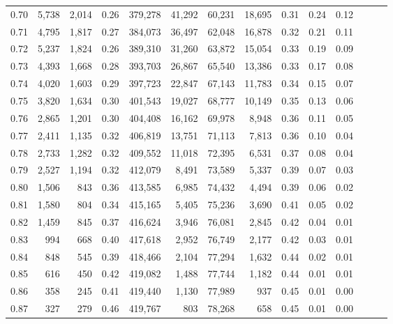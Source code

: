 \begin{tabular}{rrrrrrrrrrrrrr}
0.70 &   5,738 &  2,014 &  0.26 &  379,278 &   41,292 &  60,231 &  18,695 &  0.31 &  0.24 &      0.12 \\
0.71 &   4,795 &  1,817 &  0.27 &  384,073 &   36,497 &  62,048 &  16,878 &  0.32 &  0.21 &      0.11 \\
0.72 &   5,237 &  1,824 &  0.26 &  389,310 &   31,260 &  63,872 &  15,054 &  0.33 &  0.19 &      0.09 \\
0.73 &   4,393 &  1,668 &  0.28 &  393,703 &   26,867 &  65,540 &  13,386 &  0.33 &  0.17 &      0.08 \\
0.74 &   4,020 &  1,603 &  0.29 &  397,723 &   22,847 &  67,143 &  11,783 &  0.34 &  0.15 &      0.07 \\
0.75 &   3,820 &  1,634 &  0.30 &  401,543 &   19,027 &  68,777 &  10,149 &  0.35 &  0.13 &      0.06 \\
0.76 &   2,865 &  1,201 &  0.30 &  404,408 &   16,162 &  69,978 &   8,948 &  0.36 &  0.11 &      0.05 \\
0.77 &   2,411 &  1,135 &  0.32 &  406,819 &   13,751 &  71,113 &   7,813 &  0.36 &  0.10 &      0.04 \\
0.78 &   2,733 &  1,282 &  0.32 &  409,552 &   11,018 &  72,395 &   6,531 &  0.37 &  0.08 &      0.04 \\
0.79 &   2,527 &  1,194 &  0.32 &  412,079 &    8,491 &  73,589 &   5,337 &  0.39 &  0.07 &      0.03 \\
0.80 &   1,506 &    843 &  0.36 &  413,585 &    6,985 &  74,432 &   4,494 &  0.39 &  0.06 &      0.02 \\
0.81 &   1,580 &    804 &  0.34 &  415,165 &    5,405 &  75,236 &   3,690 &  0.41 &  0.05 &      0.02 \\
0.82 &   1,459 &    845 &  0.37 &  416,624 &    3,946 &  76,081 &   2,845 &  0.42 &  0.04 &      0.01 \\
0.83 &     994 &    668 &  0.40 &  417,618 &    2,952 &  76,749 &   2,177 &  0.42 &  0.03 &      0.01 \\
0.84 &     848 &    545 &  0.39 &  418,466 &    2,104 &  77,294 &   1,632 &  0.44 &  0.02 &      0.01 \\
0.85 &     616 &    450 &  0.42 &  419,082 &    1,488 &  77,744 &   1,182 &  0.44 &  0.01 &      0.01 \\
0.86 &     358 &    245 &  0.41 &  419,440 &    1,130 &  77,989 &     937 &  0.45 &  0.01 &      0.00 \\
0.87 &     327 &    279 &  0.46 &  419,767 &      803 &  78,268 &     658 &  0.45 &  0.01 &      0.00 \\

\end{tabular}
